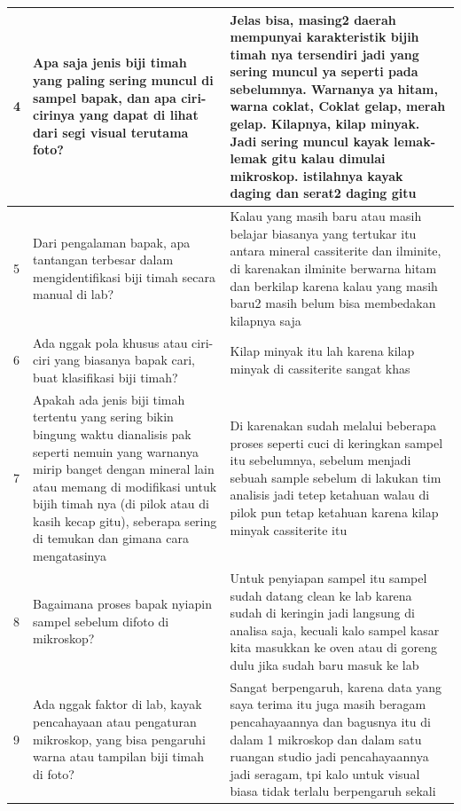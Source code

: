 {\begin{longtable}{|p{}|p{}|p{}|}
4 &
Apa saja jenis biji timah yang paling sering muncul di sampel bapak, dan apa ciri-cirinya yang dapat di lihat dari segi visual terutama foto? &
Jelas bisa, masing2 daerah mempunyai karakteristik bijih timah nya tersendiri jadi yang sering muncul ya seperti pada sebelumnya. Warnanya ya hitam, warna coklat, Coklat gelap, merah gelap. Kilapnya, kilap minyak. Jadi sering muncul kayak lemak-lemak gitu kalau dimulai mikroskop. istilahnya kayak daging dan serat2 daging gitu \\
\hline

5 &
Dari pengalaman bapak, apa tantangan terbesar dalam mengidentifikasi biji timah secara manual di lab? &
Kalau yang masih baru atau masih belajar biasanya yang tertukar itu antara mineral cassiterite dan ilminite, di karenakan ilminite berwarna hitam dan berkilap karena kalau yang masih baru2 masih belum bisa membedakan kilapnya saja \\
\hline

6 &
Ada nggak pola khusus atau ciri-ciri yang biasanya bapak cari, buat klasifikasi biji timah? &
Kilap minyak itu lah karena kilap minyak di cassiterite sangat khas \\
\hline

7 &
Apakah ada jenis biji timah tertentu yang sering bikin bingung waktu dianalisis pak seperti nemuin yang warnanya mirip banget dengan mineral lain atau memang di modifikasi untuk bijih timah nya (di pilok atau di kasih kecap gitu), seberapa sering di temukan dan gimana cara mengatasinya &
Di karenakan sudah melalui beberapa proses seperti cuci di keringkan sampel itu sebelumnya, sebelum menjadi sebuah sample sebelum di lakukan tim analisis jadi tetep ketahuan walau di pilok pun tetap ketahuan karena kilap minyak cassiterite itu \\
\hline

8 &
Bagaimana proses bapak nyiapin sampel sebelum difoto di mikroskop? &
Untuk penyiapan sampel itu sampel sudah datang clean ke lab karena sudah di keringin jadi langsung di analisa saja, kecuali kalo sampel kasar kita masukkan ke oven atau di goreng dulu jika sudah baru masuk ke lab \\
\hline

9 &
Ada nggak faktor di lab, kayak pencahayaan atau pengaturan mikroskop, yang bisa pengaruhi warna atau tampilan biji timah di foto? &
Sangat berpengaruh, karena data yang saya terima itu juga masih beragam pencahayaannya dan bagusnya itu di dalam 1 mikroskop dan dalam satu ruangan studio jadi pencahayaannya jadi seragam, tpi kalo untuk visual biasa tidak terlalu berpengaruh sekali \\
\hline


\end{longtable}}
